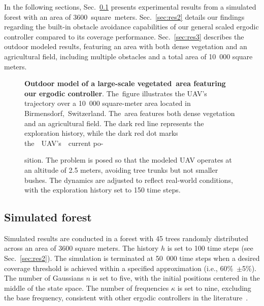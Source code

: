 \documentclass[letterpaper,10pt,conference,twoside]{IEEEtran}
\theoremstyle{definition}
\begin{document}
In the following sections, Sec.~\ref{sec:res1} presents experimental results from a simulated forest with an area of 3600~square~meters. Sec.~\ref{sec:res2} details our findings regarding the built-in obstacle avoidance capabilities of our general scaled ergodic controller compared to its coverage performance. Sec.~\ref{sec:res3} describes the outdoor modeled results, featuring an area with both dense vegetation and an agricultural field, including multiple obstacles and a total area of 10~000 square meters.

\begin{figure}[t!]
  \begin{minipage}[t!]{.67\columnwidth}
    \vspace*{-.15cm}
    \hspace*{.1cm}
  \end{minipage}\hspace*{.15cm}
  \begin{minipage}[t!]{.31\columnwidth}
    \caption[.]{\textbf{Outdoor model of a large-scale vegetated~area featuring our ergodic controller}. The~figure illustrates the UAV's trajectory over a 10~000 square-meter area located in Birmensdorf,~Switzerland. The~area features both dense vegetation and an agricultural field. The dark red line represents the exploration history, while the dark red dot marks the~~UAV's~~current po-
    }
    \vspace*{-.2cm}
    \label{fig:2}
  \end{minipage}
  \vspace*{-.18cm}
  \caption*{\footnotesize sition. The problem is posed so that the modeled UAV operates at an altitude of 2.5 meters, avoiding tree trunks but not smaller bushes. The dynamics are adjusted to reflect real-world conditions, with the exploration history set to 150 time steps.}
\end{figure}

\subsection{Simulated forest}\label{sec:res1}
\noindent
Simulated results are conducted in a forest with 45 trees randomly distributed across an area of 3600 square meters. The history $h$ is set to 100 time steps (see Sec.~\ref{sec:res2}). The simulation is terminated at 50~000 time steps when a desired coverage threshold is achieved within a specified approximation (i.e., 60\%~$\pm$5\%). The number of Gaussians $n$ is set to five, with the initial positions centered in the middle of the state space. The number of frequencies $\kappa$ is set to nine, excluding the base frequency, consistent with other ergodic controllers in the literature~\cite{seewald2024energy}. 
\end{document}
